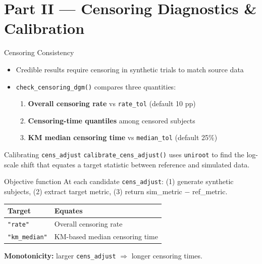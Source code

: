 \documentclass[
  11pt,
  ignorenonframetext,
  aspectratio=169,
]{beamer}
\providecommand{\tightlist}{%
  \setlength{\itemsep}{0pt}\setlength{\parskip}{0pt}}
\begin{document}
\section{Part II --- Censoring Diagnostics \&
Calibration}\label{part-ii-censoring-diagnostics-calibration}

\begin{frame}[fragile]{Censoring Consistency}
\protect{}\label{censoring-consistency}
\begin{itemize}
\tightlist
\item
  Credible results require censoring in synthetic trials to match source
  data
\item
  \texttt{check\_censoring\_dgm()} compares three quantities:

  \begin{enumerate}
  \tightlist
  \item
    \textbf{Overall censoring rate} vs \texttt{rate\_tol} (default 10
    pp)
  \item
    \textbf{Censoring-time quantiles} among censored subjects
  \item
    \textbf{KM median censoring time} vs \texttt{median\_tol} (default
    25\%)
  \end{enumerate}
\end{itemize}
\end{frame}

\begin{frame}[fragile]{Calibrating \texttt{cens\_adjust}}
\protect{}\label{calibrating-cens_adjust}
\texttt{calibrate\_cens\_adjust()} uses \texttt{uniroot} to find the
log-scale shift that equates a target statistic between reference and
simulated data.

\begin{block}{Objective function}
At each candidate \texttt{cens\_adjust}:
(1) generate synthetic subjects,
(2) extract target metric,
(3) return sim\_metric $-$ ref\_metric.
\end{block}

\begin{center}
\begin{tabular}{ll}
\toprule
Target & Equates \\
\midrule
\texttt{"rate"} & Overall censoring rate \\
\texttt{"km\_median"} & KM-based median censoring time \\
\bottomrule
\end{tabular}
\end{center}

\textbf{Monotonicity:} larger \texttt{cens\_adjust} \(\Rightarrow\)
longer censoring times.
\end{frame}
\end{document}
